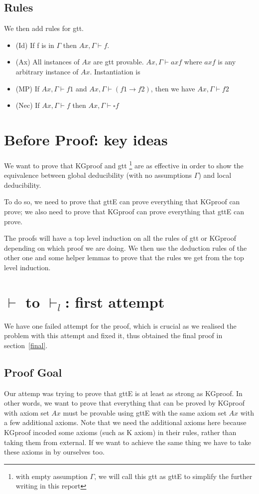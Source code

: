 \documentclass[submission,copyright,creativecommons]{eptcs}
\begin{document}
\subsection{Rules}
We then add rules for gtt. 
\begin{itemize}
  \item (Id) If f is in $\Gamma$ then $Ax, \Gamma \vdash f$. 
  \item (Ax) All instances of $Ax$ are gtt provable. $Ax, \Gamma \vdash axf$ where $axf$ is 
  any arbitrary instance of $Ax$. Instantiation is  
  \item (MP) If $Ax, \Gamma \vdash f1$ and $Ax, \Gamma \vdash (f1 \rightarrow f2)$, then 
  we have $Ax, \Gamma \vdash f2$
  \item (Nec) If $Ax, \Gamma \vdash f$ then $Ax, \Gamma \vdash \square f$ 
\end{itemize}

\section{Before Proof: key ideas}
We want to prove that KGproof and gtt \footnote{with empty assumption $\Gamma$, 
we will call this gtt as gttE to simplify the further writing in this report}
 are as effective 
in order to show the equivalence between global deducibility (with no assumptions $\Gamma$) and local deducibility. 

To do so, we need to prove that gttE
can prove everything that KGproof can prove; 
we also need to prove that KGproof can prove everything that gttE can prove.

The proofs will have a top level induction on all the rules of gtt or KGproof depending on which 
proof we are doing. We then use the deduction rules of the other one and some helper lemmas 
to prove that the rules we get from the top level induction.

\section{$\vdash$ to $\vdash_l$: first attempt}
We have one failed attempt for the proof, which is crucial as we 
realised the problem with this attempt and fixed it, thus obtained the final proof 
in section~\ref{final}.


\subsection{Proof Goal}

Our attemp was trying to prove that gttE is at least as strong as KGproof.
In other words, we want to prove that everything that can be proved by KGproof with axiom set $Ax$
must be provable using gttE with the same axiom set $Ax$ with a few additional axioms.
Note that we need the additional axioms here because KGproof incoded some axioms (such as K axiom) 
in their rules, rather than taking them from external. If we want to achieve the same 
thing we have to take these axioms in by ourselves too. 
\end{document}

